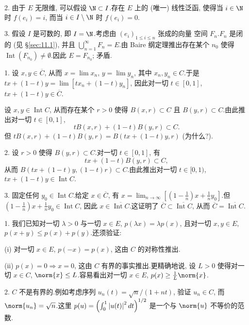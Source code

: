 2. 由于 $E$ 无限维, 可以假设 $\N\subset I$.存在 $E$ 上的 (唯一) 线性泛函,
使得当 $i\in\N$ 时 $f(e_i)=i$, 而当 $i\in I\setminus\N$ 时 $f(e_i)=0$.

3. 假设 $I$ 是可数的, 即 $I=\N$.考虑由 $(e_i)_{1\le i\le n}$ 张成的向量
空间 $F_n$.$F_n$ 是闭的 (见 \S \ref{sec:11.1}), 并且
$\bigcup_{n=1}^\infty F_n=E$.由 Baire 纲定理推出存在某个 $n_0$ 使得
$\operatorname{Int}(F_{n_0})\ne\emptyset$.因此 $E=F_{n_0}$; 矛盾.


1. 设 $x,y\in\overline C$, 从而 $x=\lim x_n$, $y=\lim y_n$, 其中
$x_n,y_n\in C$.于是 $tx+(1-t)y=\lim[tx_n+(1-t)y_n]$, 因此对一切
$t\in[0,1]$, $tx+(1-t)y\in\overline C$.

设 $x,y\in\operatorname{Int}C$, 从而存在某个 $r>0$ 使得 $B(x,r)\subset C$
且 $B(y,r)\subset C$.由此推出对一切 $t\in[0,1]$,
\begin{equation*}
tB(x,r)+(1-t)B(y,r)\subset C.
\end{equation*}
但 $tB(x,r)+(1-t)B(y,r)=B(tx+(1-t)y,r)$ (为什么?).

2. 设 $r>0$ 使得 $B(y,r)\subset C$.对一切 $t\in[0,1]$, 有
\begin{equation*}
tx+(1-t)B(y,r)\subset C,
\end{equation*}
从而 $B(tx+(1-t)y,(1-t)r)\subset C$.由此推出对一切 $t\in[0,1)$,
$tx+(1-t)y\in\operatorname{Int}C$.

3. 固定任何 $y_0\in\operatorname{Int}C$.给定 $x\in\overline C$, 有
$x=\lim_{n\to\infty}\left[\left(1-\frac1n\right)x+\frac1ny_0\right]$.但
$\left(1-\frac1n\right)x+\frac1ny_0\in\operatorname{Int}C$, 因此
$x\in\overline{\operatorname{Int}C}$.这证明了
$\overline C\subset\overline{\operatorname{Int}C}$, 从而
$\overline C=\overline{\operatorname{Int}C}$.


1. 我们已知对一切 $\lambda>0$ 与一切 $x\in E$, $p(\lambda x)=\lambda p(x)$,
且对一切 $x,y\in E$, $p(x+y)\le p(x)+p(y)$.还须验证:

(i) 对一切 $x\in E$, $p(-x)=p(x)$, 这由 $C$ 的对称性推出.

(ii) $p(x)=0\Rightarrow x=0$, 这由 $C$ 有界的事实推出.更精确地说, 设
$L>0$ 使得对一切 $x\in C$, $\norm{x}\le L$.容易看出对一切 $x\in E$,
$p(x)\ge\frac1L\norm{x}$.

2. $C$ 不是有界的.例如考虑序列 $u_n(t)=\sqrt{n}/(1+nt)$, 验证 $u_n\in C$,
而 $\norm{u_n}=\sqrt{n}$.这里 $p(u)=\left(\int_0^1\left|u(t)\right|^2dt\right)^{1/2}$
是一个与 $\norm{u}$ 不等价的范数.

